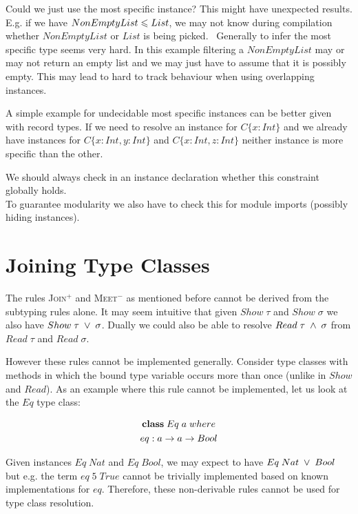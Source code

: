   Could we just use the most specific instance? This might have unexpected results.
  E.g. if we have $NonEmptyList \leqslant List$, we may not know during compilation whether $NonEmptyList$ or $List$ is being picked.
  ~Generally to infer the most specific type seems very hard. In this example filtering a $NonEmptyList$ may or may not return an empty list and we may just have to assume that it is possibly empty.
  This may lead to hard to track behaviour when using overlapping instances.

  A simple example for undecidable most specific instances can be better given with record types.
  If we need to resolve an instance for $C \{x : Int\}$ and we already have instances for $C \{x : Int, y : Int\}$ and $C \{x : Int, z : Int\}$ neither instance is more specific than the other.


  We should always check in an instance declaration whether this constraint globally holds. \\
  To guarantee modularity we also have to check this for module imports (possibly hiding instances).

\section{Joining Type Classes}

The rules \textsc{Join}$^+$ and \textsc{Meet}$^-$ as mentioned before cannot be derived from the subtyping rules alone.
It may seem intuitive that given $Show \; \tau$ and $Show \; \sigma$ we also have $Show \; \tau \; \vee \; \sigma$.
Dually we could also be able to resolve $Read \; \tau \; \wedge \; \sigma$ from $Read \; \tau$ and $Read \; \sigma$.

However these rules cannot be implemented generally.
Consider type classes with methods in which the bound type variable occurs more than once (unlike in $Show$ and $Read$).
As an example where this rule cannot be implemented, let us look at the $Eq$ type class:

\begin{gather}
\nonumber {\bf class} \; Eq \; a \; where\\
\nonumber  eq : a \to a \to Bool
\end{gather}

Given instances $Eq \; Nat$ and $Eq \; Bool$, we may expect to have $Eq \; Nat \; \vee \; Bool$ but e.g. the term $eq \; 5 \; True$ cannot be trivially implemented based on known implementations for $eq$.
Therefore, these non-derivable rules cannot be used for type class resolution.

